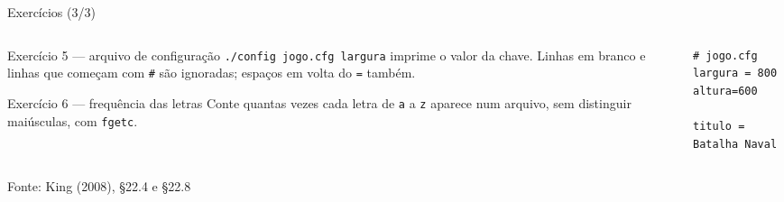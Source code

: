 \documentclass[aspectratio=169]{beamer}
\newcommand{\fonte}[1]{\vfill\hfill{\scriptsize\textcolor{UFSGray}{Fonte: #1}}}
\begin{document}
\begin{frame}[fragile]{Exercícios (3/3)}
  \footnotesize
  \begin{columns}[T]
    \begin{column}{0.56\textwidth}
      \begin{block}{Exercício 5 --- arquivo de configuração}
        \texttt{./config jogo.cfg largura} imprime o valor da chave.
        Linhas em branco e linhas que começam com \texttt{\#} são
        ignoradas; espaços em volta do \texttt{=} também.
      \end{block}
      \begin{block}{Exercício 6 --- frequência das letras}
        Conte quantas vezes cada letra de \texttt{a} a \texttt{z} aparece
        num arquivo, sem distinguir maiúsculas, com \texttt{fgetc}.
      \end{block}
    \end{column}
    \begin{column}{0.40\textwidth}
\begin{lstlisting}[style=shellS, language={}]
# jogo.cfg
largura = 800
altura=600

titulo = Batalha Naval
\end{lstlisting}
    \end{column}
  \end{columns}
  \fonte{King (2008), §22.4 e §22.8~\cite{king2008c}}
\end{frame}
\end{document}
